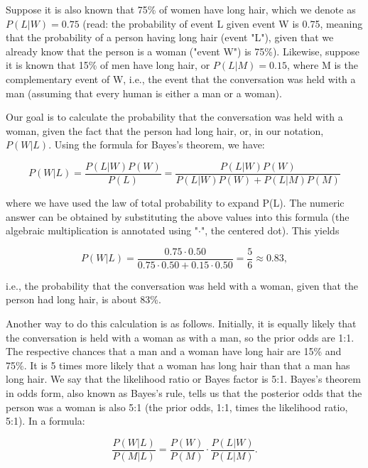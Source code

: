 Suppose it is also known that 75\% of women have long hair, which we denote as $P(L |W) = 0.75$ (read: the probability of event L given event W is 0.75, meaning that the probability of a person having long hair (event "L"), given that we already know that the person is a woman ("event W") is 75\%). Likewise, suppose it is known that 15\% of men have long hair, or $P(L|M) = 0.15$, where M is the complementary event of W, i.e., the event that the conversation was held with a man (assuming that every human is either a man or a woman).

Our goal is to calculate the probability that the conversation was held with a woman, given the fact that the person had long hair, or, in our notation, $P(W|L)$. Using the formula for Bayes's theorem, we have:

\begin{equation*}
  P(W|L) = \frac{P(L|W) P(W)}{P(L)} = \frac{P(L|W) P(W)}{P(L|W) P(W) + P(L|M) P(M)}
\end{equation*}

where we have used the law of total probability to expand P(L). The numeric answer can be obtained by substituting the above values into this formula (the algebraic multiplication is annotated using "$\cdot$", the centered dot). This yields

\begin{equation*}
  P(W|L) = \frac{0.75\cdot0.50}{0.75\cdot0.50 + 0.15\cdot0.50} = \frac56\approx 0.83,
\end{equation*}

i.e., the probability that the conversation was held with a woman, given that the person had long hair, is about 83\%.

Another way to do this calculation is as follows. Initially, it is equally likely that the conversation is held with a woman as with a man, so the prior odds are 1:1. The respective chances that a man and a woman have long hair are 15\% and 75\%. It is 5 times more likely that a woman has long hair than that a man has long hair. We say that the likelihood ratio or Bayes factor is 5:1. Bayes's theorem in odds form, also known as Bayes's rule, tells us that the posterior odds that the person was a woman is also 5:1 (the prior odds, 1:1, times the likelihood ratio, 5:1). In a formula:

\begin{equation*}
  \frac{P(W|L)}{P(M|L)} = \frac{P(W)}{P(M)} \cdot \frac{P(L|W)}{P(L|M)}.
\end{equation*}

